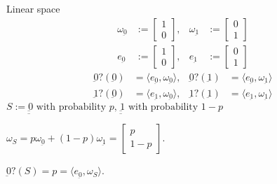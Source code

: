 \documentclass{beamer}
\theoremstyle{definition}
\begin{document}
\begin{frame}{Linear space}
\begin{align*}
\omega_{\underbar{0}} &:= \begin{bmatrix}1\\0\end{bmatrix},&
\omega_{\underbar{1}} &:= \begin{bmatrix}0\\1\end{bmatrix}\\
e_{\underbar{0}} &:= \begin{bmatrix}1\\0\end{bmatrix},&
e_{\underbar{1}} &:= \begin{bmatrix}0\\1\end{bmatrix}
\end{align*}
\begin{align*}
{\underbar{0}}?({\underbar{0}}) &= \langle e_{\underbar{0}}, \omega_{\underbar{0}}\rangle,&
{\underbar{0}}?({\underbar{1}}) &= \langle e_{\underbar{0}}, \omega_{\underbar{1}}\rangle\\
{\underbar{1}}?({\underbar{0}}) &= \langle e_{\underbar{1}}, \omega_{\underbar{0}}\rangle,&
{\underbar{1}}?({\underbar{1}}) &= \langle e_{\underbar{1}}, \omega_{\underbar{1}}\rangle
\end{align*}
$S := \text{$\underbar{{\underbar{0}}}$ with probability $p$, $\underbar{{\underbar{1}}}$ with probability $1-p$}$

$\omega_S = p \omega_{\underbar{0}} + (1-p) \omega_{\underbar{1}}=\begin{bmatrix}p\\1-p\end{bmatrix}$.

\vspace{1em}
${\underbar{0}?}(S) = p= \langle e_{\underbar{0}}, \omega_S\rangle$.

\end{frame}
\end{document}
